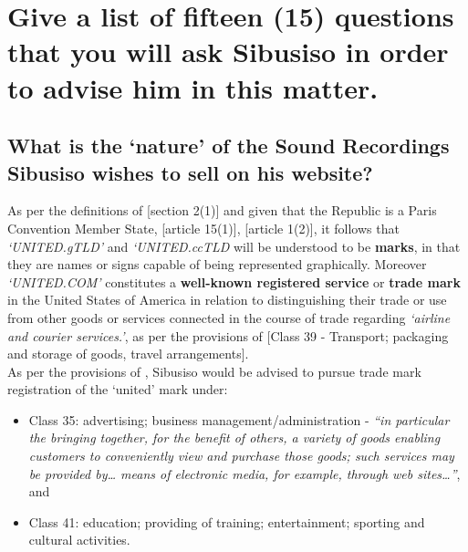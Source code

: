 \documentclass[11pt]{article}
\begin{document}
\section{Give a list of fifteen (15) questions that you will ask Sibusiso in order to advise him in this matter.}
\label{sec:org62ab85a}

\subsection{What is the `nature' of the Sound Recordings Sibusiso wishes to sell on his website?}
\label{sec:orgaafbc12}
As per the definitions of [section 2(1)]\cite{rsa93_tm_act} and given that the
Republic is a Paris Convention Member State, [article 15(1)]\cite{wto17_trips},
[article 1(2)]\cite{wipo83_paris_conve_protect_ip}, it follows that
\emph{`UNITED.gTLD'} and \emph{`UNITED.ccTLD} will be understood to be \textbf{marks}, in that
they are names or signs capable of being represented graphically. Moreover
\emph{`UNITED.COM'} constitutes a \textbf{well-known registered service} or \textbf{trade mark} in
the United States of America in relation to distinguishing their trade or use
from other goods or services connected in the course of trade regarding
\emph{`airline and courier services.'}, as per the provisions of [Class 39 -
Transport; packaging and storage of goods, travel
arrangements]\cite{wipo57_ncl}.\\

As per the provisions of \cite{wipo57_ncl}, Sibusiso would be advised to pursue
trade mark registration of the `united' mark under:
\begin{itemize}
\item Class 35: advertising; business management/administration - \emph{``in particular the bringing together, for the benefit of others, a variety of goods enabling customers to conveniently view and purchase those goods; such services may be provided by\ldots{} means of electronic media, for example, through web sites\ldots{}''}, and
\item Class 41: education; providing of training; entertainment; sporting and
cultural activities.
\end{itemize}
\end{document}
